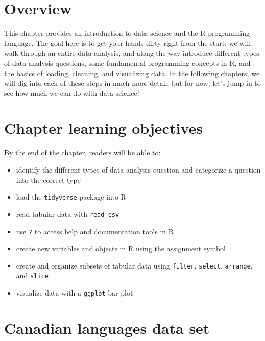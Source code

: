 \documentclass[
]{book}
\providecommand{\tightlist}{%
  \setlength{\itemsep}{0pt}\setlength{\parskip}{0pt}}
\begin{document}
\hypertarget{overview}{%
\section{Overview}\label{overview}}

This chapter provides an introduction to data science and the R programming language.
The goal here is to get your hands dirty right from the start: we will walk through an entire data analysis,
and along the way introduce different types of data analysis questions, some fundamental programming
concepts in R, and the basics of loading, cleaning, and visualizing data. In the following chapters, we will
dig into each of these steps in much more detail; but for now, let's jump in to see how much we can do
with data science!

\hypertarget{chapter-learning-objectives}{%
\section{Chapter learning objectives}\label{chapter-learning-objectives}}

By the end of the chapter, readers will be able to:

\begin{itemize}
\tightlist
\item
  identify the different types of data analysis question and categorize a question into the correct type
\item
  load the \texttt{tidyverse} package into R
\item
  read tabular data with \texttt{read\_csv}
\item
  use \texttt{?} to access help and documentation tools in R
\item
  create new variables and objects in R using the assignment symbol
\item
  create and organize subsets of tabular data using \texttt{filter}, \texttt{select}, \texttt{arrange}, and \texttt{slice}
\item
  visualize data with a \texttt{ggplot} bar plot
\end{itemize}

\hypertarget{canadian-languages-data-set}{%
\section{Canadian languages data set}\label{canadian-languages-data-set}}
\end{document}
